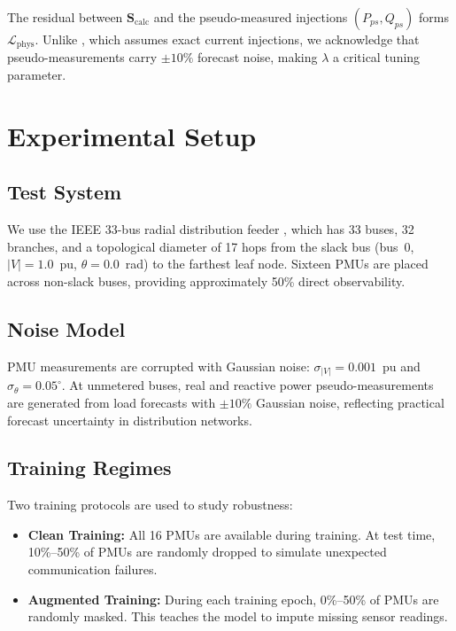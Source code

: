 \documentclass[conference]{IEEEtran}
\begin{document}
The residual between $\mathbf{S}_{\text{calc}}$ and the pseudo-measured injections $(P_{ps}, Q_{ps})$ forms $\mathcal{L}_{\text{phys}}$. Unlike \cite{iliadis2025}, which assumes exact current injections, we acknowledge that pseudo-measurements carry ${\pm}10\%$ forecast noise, making $\lambda$ a critical tuning parameter.

\section{Experimental Setup}

\subsection{Test System}

We use the IEEE 33-bus radial distribution feeder \cite{baran1989}, which has 33 buses, 32 branches, and a topological diameter of 17 hops from the slack bus (bus~0, $|V|=1.0$~pu, $\theta=0.0$~rad) to the farthest leaf node. Sixteen PMUs are placed across non-slack buses, providing approximately 50\% direct observability.

\subsection{Noise Model}

PMU measurements are corrupted with Gaussian noise: $\sigma_{|V|} = 0.001$~pu and $\sigma_\theta = 0.05^\circ$. At unmetered buses, real and reactive power pseudo-measurements are generated from load forecasts with ${\pm}10\%$ Gaussian noise, reflecting practical forecast uncertainty in distribution networks.

\subsection{Training Regimes}

Two training protocols are used to study robustness:
\begin{itemize}
    \item \textbf{Clean Training:} All 16 PMUs are available during training. At test time, 10\%--50\% of PMUs are randomly dropped to simulate unexpected communication failures.
    \item \textbf{Augmented Training:} During each training epoch, 0\%--50\% of PMUs are randomly masked. This teaches the model to impute missing sensor readings.
\end{itemize}
\end{document}

